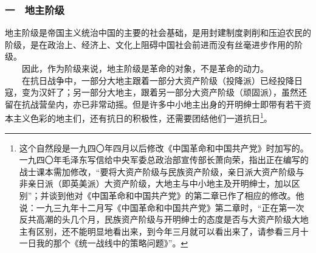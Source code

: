 \documentclass[cn,11pt,chinese]{elegantbook}
\def\myformat#1{\hfil\hfil #1}
\begin{document}
\subsubsection*{\myformat{一　地主阶级}}
地主阶级是帝国主义统治中国的主要的社会基础，是用封建制度剥削和压迫农民的阶级，是在政治上、经济上、文化上阻碍中国社会前进而没有丝毫进步作用的阶级。\\
　　因此，作为阶级来说，地主阶级是革命的对象，不是革命的动力。\\
　　在抗日战争中，一部分大地主跟着一部分大资产阶级（投降派）已经投降日寇，变为汉奸了；另一部分大地主，跟着另一部分大资产阶级（顽固派），虽然还留在抗战营垒内，亦已非常动摇。但是许多中小地主出身的开明绅士即带有若干资本主义色彩的地主们，还有抗日的积极性，还需要团结他们一道抗日\footnote[34]{ 这个自然段是一九四〇年四月以后修改《中国革命和中国共产党》时加写的。一九四〇年毛泽东写信给中央军委总政治部宣传部长萧向荣，指出正在编写的战士课本需加修改，“要将大资产阶级与民族资产阶级，亲日派大资产阶级与非亲日派（即英美派）大资产阶级，大地主与中小地主及开明绅士，加以区别”；并谈到他对《中国革命和中国共产党》的第二章已作了相应的修改。他说：一九三九年十二月写《中国革命和中国共产党》第二章时，“正在第一次反共高潮的头几个月，民族资产阶级与开明绅士的态度是否与大资产阶级大地主有区别，还不能明显地看出来，到今年三月就可以看出来了，请参看三月十一日我的那个《统一战线中的策略问题》”。}。\\
\end{document}
